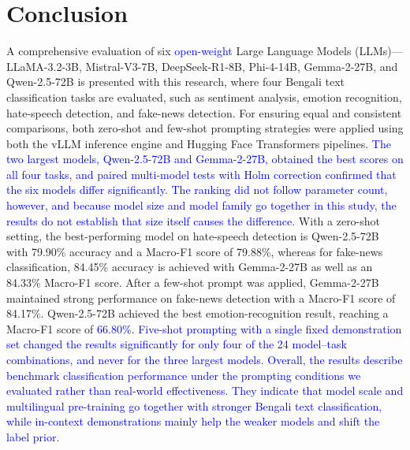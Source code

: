 \documentclass[10pt,letterpaper]{article}
\newcommand{\rev}[1]{\textcolor{blue}{#1}}
\begin{document}
\section*{Conclusion}
\label{sec:conclusion} 

A comprehensive evaluation of six \rev{open-weight} Large Language Models (LLMs)—LLaMA-3.2-3B, Mistral-V3-7B, DeepSeek-R1-8B, Phi-4-14B, Gemma-2-27B, and Qwen-2.5-72B is presented with this research, where four Bengali text classification tasks are evaluated, such as sentiment analysis, emotion recognition, hate-speech detection, and fake-news detection. For ensuring equal and consistent comparisons, both zero-shot and few-shot prompting strategies were applied using both the vLLM inference engine and Hugging Face Transformers pipelines. \rev{The two largest models, Qwen-2.5-72B and Gemma-2-27B, obtained the best scores on all four tasks, and paired multi-model tests with Holm correction confirmed that the six models differ significantly. The ranking did not follow parameter count, however, and because model size and model family go together in this study, the results do not establish that size itself causes the difference.} With a zero-shot setting, the best-performing model on hate-speech detection is Qwen-2.5-72B with 79.90\% accuracy and a Macro-F1 score of 79.88\%, whereas for fake-news classification, 84.45\% accuracy is achieved with Gemma-2-27B as well as an 84.33\% Macro-F1 score. After a few-shot prompt was applied, Gemma-2-27B maintained strong performance on fake-news detection with a Macro-F1 score of 84.17\%. Qwen-2.5-72B achieved the best emotion-recognition result, reaching a Macro-F1 score of \rev{66.80\%}. \rev{Five-shot prompting with a single fixed demonstration set changed the results significantly for only four of the 24 model--task combinations, and never for the three largest models. Overall, the results describe benchmark classification performance under the prompting conditions we evaluated rather than real-world effectiveness. They indicate that model scale and multilingual pre-training go together with stronger Bengali text classification, while in-context demonstrations mainly help the weaker models and shift the label prior.}
\end{document}
